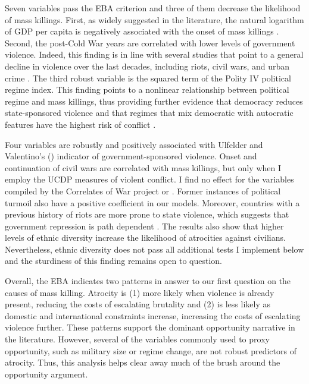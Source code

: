 \documentclass[a4paper,12pt]{article}
\begin{document}
Seven variables pass the EBA criterion and three of them decrease the likelihood of mass killings. First, as widely suggested in the literature, the natural logarithm of GDP per capita is negatively associated with the onset of mass killings \citep[e.g.,][]{besanccon2005relative, easterly2006development,esteban2015strategic}. Second, the post-Cold War years are correlated with lower levels of government violence. Indeed, this finding is in line with several studies that point to a general decline in violence over the last decades, including riots, civil wars, and urban crime \citep{pinker2011better,straus2012wars,valentino2014we}. The third robust variable is the squared term of the Polity IV political regime index. This finding points to a nonlinear relationship between political regime and mass killings, thus providing further evidence that democracy reduces state-sponsored violence \citep{rost2013will,rummel1995democracy} and that regimes that mix democratic with autocratic features have the highest risk of conflict \citep{hegre2001toward,muchlinski2014grievances}.
	
Four variables are robustly and positively associated with Ulfelder and Valentino's (\citeyear{ulfelder2008assessing}) indicator of government-sponsored violence. Onset and continuation of civil wars are correlated with mass killings, but only when I employ the UCDP measures of violent conflict. I find no effect for the variables compiled by the Correlates of War project or \cite{cederman2010ethnic}. Former instances of political turmoil also have a positive coefficient in our models. Moreover, countries with a previous history of riots are more prone to state violence, which suggests that government repression is path dependent \citep[e.g.,][]{gurr2000peoples,harff2003no,krain1997state,nyseth2017re}. The results also show that higher levels of ethnic diversity increase the likelihood of atrocities against civilians. Nevertheless, ethnic diversity does not pass all additional tests I implement below and the sturdiness of this finding remains open to question.

Overall, the EBA indicates two patterns in answer to our first question on the causes of mass killing. Atrocity is (1) more likely when violence is already present, reducing the costs of escalating brutality and (2) is less likely as domestic and international constraints increase, increasing the costs of escalating violence further. These patterns support the dominant opportunity narrative in the literature. However, several of the variables commonly used to proxy opportunity, such as military size or regime change, are not robust predictors of atrocity. Thus, this analysis helps clear away much of the brush around the opportunity argument.
\end{document}

